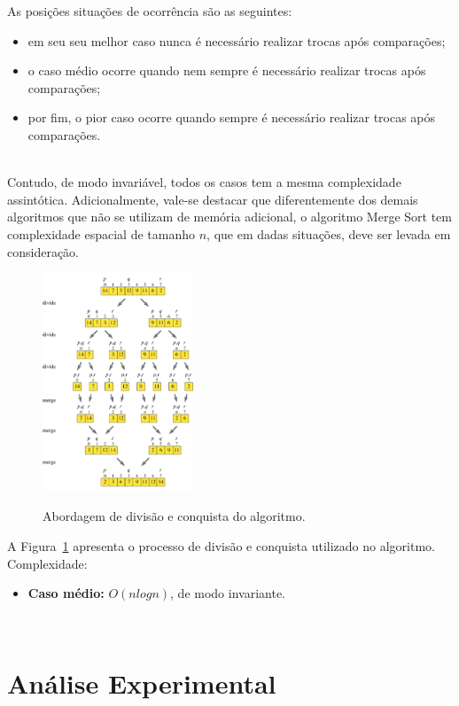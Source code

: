 \documentclass[conference]{IEEEtran}
\begin{document}
As posições situações de ocorrência são as seguintes:
\begin{itemize}
\item em seu seu melhor caso nunca é necessário realizar trocas após comparações;
\item o caso médio ocorre quando nem sempre é necessário realizar trocas após comparações;
\item por fim, o pior caso ocorre quando sempre é necessário realizar trocas após comparações.
\end{itemize}~\\

Contudo, de modo invariável, todos os casos tem a mesma complexidade assintótica. Adicionalmente, vale-se destacar que diferentemente dos demais algoritmos que não se utilizam de memória adicional, o algoritmo Merge Sort tem complexidade espacial de tamanho $n$, que em dadas situações, deve ser levada em consideração.

\begin{figure}
  \caption{Abordagem de divisão e conquista do algoritmo.}
  \centering
    \includegraphics[width=0.4\textwidth]{images/merge.png}
    \label{image:merge}
\end{figure}

A Figura~\ref{image:merge} apresenta o processo de divisão e conquista utilizado no algoritmo.\\

Complexidade:
\begin{itemize}
\item \textbf{Caso médio:} $O (nlog n)$, de modo invariante.
\end{itemize}

~\\
\section{Análise Experimental}
\end{document}
